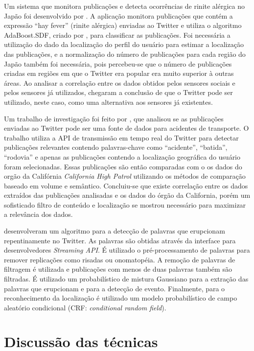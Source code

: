 Um sistema que monitora publicações e detecta ocorrências de rinite alérgica no Japão foi desenvolvido por . A aplicação monitora publicações que contém a expressão ``hay fever'' (rinite alérgica) enviadas ao Twitter e utiliza o algoritmo AdaBoost.SDF, criado por , para classificar as publicações. Foi necessária a utilização do dado da localização do perfil do usuário para estimar a localização das publicações, e a normalização do número de publicações para cada região do Japão também foi necessária, pois percebeu-se que o número de publicações criadas em regiões em que o Twitter era popular era muito superior à outras áreas. Ao analisar a correlação entre os dados obtidos pelos sensores sociais e pelos sensores já utilizados,  chegaram a conclusão de que o Twitter pode ser utilizado, neste caso, como uma alternativa aos sensores já existentes.

Um trabalho de investigação foi feito por , que analisou se as publicações enviadas ao Twitter pode ser uma fonte de dados para acidentes de transporte. O trabalho utiliza a API de transmissão em tempo real do Twitter para detectar publicações relevantes contendo palavras-chave como ``acidente'', ``batida'', ``rodovia'' e apenas as publicações contendo a localização geográfica do usuário foram selecionadas. Essas publicações são então comparadas com o os dados do orgão da Califórnia \textit{California High Patrol} utilizando os métodos de comparação baseado em volume e semântico. Concluiu-se que existe correlação entre os dados extraídos das publicações analisadas e os dados do órgão da California, porém um sofisticado filtro de conteúdo e localização se mostrou necessário para maximizar a relevância dos dados.

 desenvolveram um algoritmo para a detecção de palavras que erupcionam repentinamente no Twitter. As palavras são obtidas através da interface para desenvolvedores \textit{Streaming API}. É utilizado o pré-processamento de palavras para remover replicações como risadas ou onomatopéia. A remoção de palavras de filtragem é utilizada e publicações com menos de duas palavras também são filtradas. É utilizado um probabilístico de mistura Gaussiano para a extração das palavras que erupcionam e para a detecção de evento. Finalmente, para o reconhecimento da localização é utilizado um modelo probabilístico de campo aleatório condicional (CRF: \textit{conditional random field}).

\section{Discussão das técnicas}

